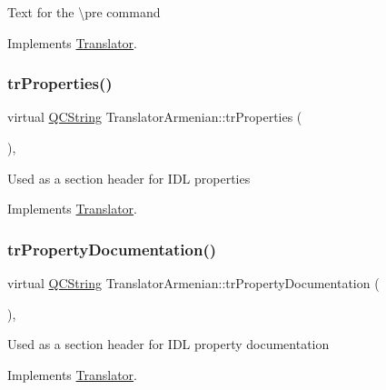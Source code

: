 Text for the \textbackslash{}pre command 

Implements \mbox{\hyperlink{class_translator}{Translator}}.

\mbox{\label{class_translator_armenian_a2df6ca35dd7724ae392d01672b1a465e}} 
\subsubsection{\texorpdfstring{trProperties()}{trProperties()}}
{\footnotesize\ttfamily virtual \mbox{\hyperlink{class_q_c_string}{Q\+C\+String}} Translator\+Armenian\+::tr\+Properties (\begin{DoxyParamCaption}{ }\end{DoxyParamCaption})\hspace{0.3cm}{\ttfamily [inline]}, {\ttfamily [virtual]}}

Used as a section header for I\+DL properties 

Implements \mbox{\hyperlink{class_translator}{Translator}}.

\mbox{\label{class_translator_armenian_ab10f045ddf92e2c52ff8a89e744556c1}} 
\subsubsection{\texorpdfstring{trPropertyDocumentation()}{trPropertyDocumentation()}}
{\footnotesize\ttfamily virtual \mbox{\hyperlink{class_q_c_string}{Q\+C\+String}} Translator\+Armenian\+::tr\+Property\+Documentation (\begin{DoxyParamCaption}{ }\end{DoxyParamCaption})\hspace{0.3cm}{\ttfamily [inline]}, {\ttfamily [virtual]}}

Used as a section header for I\+DL property documentation 

Implements \mbox{\hyperlink{class_translator}{Translator}}.

\mbox{\label{class_translator_armenian_af18f8c16dd7b6c5fffd1639fa1eb7cb9}} 
